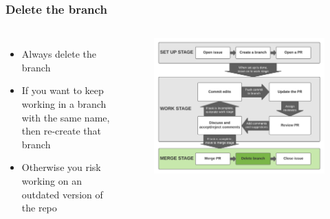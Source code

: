 \documentclass[aspectratio=169]{beamer} %
\begin{document}
\begin{frame}
	\frametitle{Delete the branch}
	\begin{columns}[c]
		
		\begin{itemize}
			\setlength\itemsep{1em}
			\item Always delete the branch
			\item If you want to keep working in a branch with the same name, then re-create that branch
			\item Otherwise you risk working on an outdated version of the repo
		\end{itemize}
		
		\vspace{-.75cm}
		\begin{figure}
			\centering
			\includegraphics[width=\textwidth]{./img/branch-pr-merge-cycle-S3-2.png}
		\end{figure}
		
	\end{columns}
\end{frame}
\end{document}
